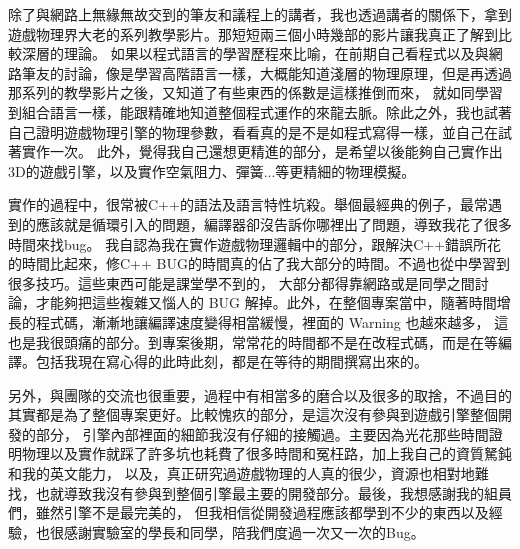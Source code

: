 除了與網路上無緣無故交到的筆友和議程上的講者，我也透過講者的關係下，拿到遊戲物理界大老的系列教學影片。那短短兩三個小時幾部的影片讓我真正了解到比較深層的理論。
如果以程式語言的學習歷程來比喻，在前期自己看程式以及與網路筆友的討論，像是學習高階語言一樣，大概能知道淺層的物理原理，但是再透過那系列的教學影片之後，又知道了有些東西的係數是這樣推倒而來，
就如同學習到組合語言一樣，能跟精確地知道整個程式運作的來龍去脈。除此之外，我也試著自己證明遊戲物理引擎的物理參數，看看真的是不是如程式寫得一樣，並自己在試著實作一次。
此外，覺得我自己還想更精進的部分，是希望以後能夠自己實作出3D的遊戲引擎，以及實作空氣阻力、彈簧...等更精細的物理模擬。

實作的過程中，很常被C++的語法及語言特性坑殺。舉個最經典的例子，最常遇到的應該就是循環引入的問題，編譯器卻沒告訴你哪裡出了問題，導致我花了很多時間來找bug。
我自認為我在實作遊戲物理邏輯中的部分，跟解決C++錯誤所花的時間比起來，修C++ BUG的時間真的佔了我大部分的時間。不過也從中學習到很多技巧。這些東西可能是課堂學不到的，
大部分都得靠網路或是同學之間討論，才能夠把這些複雜又惱人的 BUG 解掉。此外，在整個專案當中，隨著時間增長的程式碼，漸漸地讓編譯速度變得相當緩慢，裡面的 Warning 也越來越多，
這也是我很頭痛的部分。到專案後期，常常花的時間都不是在改程式碼，而是在等編譯。包括我現在寫心得的此時此刻，都是在等待的期間撰寫出來的。

另外，與團隊的交流也很重要，過程中有相當多的磨合以及很多的取捨，不過目的其實都是為了整個專案更好。比較愧疚的部分，是這次沒有參與到遊戲引擎整個開發的部分，
引擎內部裡面的細節我沒有仔細的接觸過。主要因為光花那些時間證明物理以及實作就踩了許多坑也耗費了很多時間和冤枉路，加上我自己的資質駑鈍和我的英文能力，
以及，真正研究過遊戲物理的人真的很少，資源也相對地難找，也就導致我沒有參與到整個引擎最主要的開發部分。最後，我想感謝我的組員們，雖然引擎不是最完美的，
但我相信從開發過程應該都學到不少的東西以及經驗，也很感謝實驗室的學長和同學，陪我們度過一次又一次的Bug。

\newpage